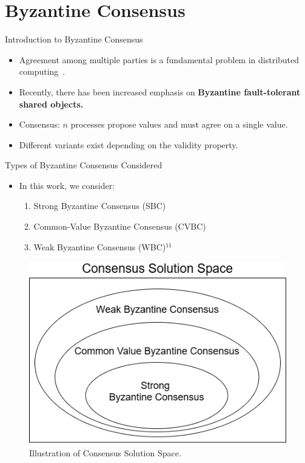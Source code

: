 \documentclass{beamer}
\begin{document}
\section{Byzantine Consensus}


\begin{frame}{Introduction to Byzantine Consensus}
\begin{itemize}
  \item Agreement among multiple parties is a fundamental problem in distributed computing~.
  \item Recently, there has been increased emphasis on \textbf{Byzantine fault-tolerant shared objects.}~
  \item Consensus: $n$ processes propose values and must agree on a single value.
  \item Different variants exist depending on the validity property.
\end{itemize}
\end{frame}

\begin{frame}{Types of Byzantine Consensus Considered} 
\begin{itemize} \item In this work, we consider: 

\begin{enumerate} 
\item Strong Byzantine Consensus (SBC)~ 
\item Common-Value Byzantine Consensus (CVBC)~ 
\item Weak Byzantine Consensus (WBC)$^{11}$
\end{enumerate} 
\end{itemize} 
\begin{figure} 
\centering
\includegraphics[width=0.35\linewidth]{ByzSolSpace.png} 
\vspace{-1em}\caption{Illustration of Consensus Solution Space.} \label{fig:ByzSol}
\end{figure}

\end{frame}
\end{document}
